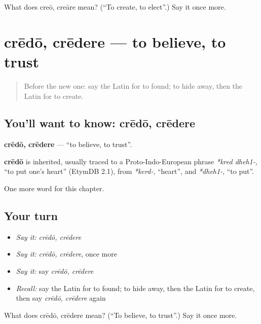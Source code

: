 \begin{tcolorbox}[breakable,colback=teal!4,colframe=teal!35!black,title={Before you move on}]
What does creō, creāre mean? (\textquotedblleft{}To create, to elect\textquotedblright{}.) Say it once more.
\end{tcolorbox}
\section[crēdō, crēdere]{crēdō, crēdere — to believe, to trust}

\label{lesson:LA-C171-credo}



\begin{quote}
Before the new one: say the Latin for to found; to hide away, then the Latin for to create.
\end{quote}

\subsection*{You'll want to know: crēdō, crēdere}
\textbf{crēdō, crēdere} — \textquotedblleft{}to believe, to trust\textquotedblright{}.

\begin{cousinweb}
\textbf{crēdō} is inherited, usually traced to a Proto-Indo-European phrase \emph{*kred dheh1-}, \textquotedblleft{}to put one's heart\textquotedblright{} (EtymDB 2.1), from \emph{*kerd-}, \textquotedblleft{}heart\textquotedblright{}, and \emph{*dheh1-}, \textquotedblleft{}to put\textquotedblright{}.
\end{cousinweb}

\begin{grammarlens}[title={What you've built}]
One more word for this chapter.
\end{grammarlens}

\subsection*{Your turn}
\begin{itemize}
\raggedright
  \item \emph{Say it:} \emph{crēdō, crēdere}
  \item \emph{Say it:} \emph{crēdō, crēdere}, once more
  \item \emph{Say it:} say \emph{crēdō, crēdere}
  \item \emph{Recall:} say the Latin for to found; to hide away, then the Latin for to create, then say \emph{crēdō, crēdere} again
\end{itemize}

\begin{tcolorbox}[breakable,colback=teal!4,colframe=teal!35!black,title={Before you move on}]
What does crēdō, crēdere mean? (\textquotedblleft{}To believe, to trust\textquotedblright{}.) Say it once more.
\end{tcolorbox}

